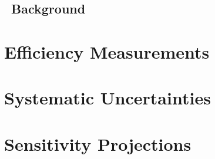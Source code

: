 \documentclass{cmspaper}
\begin{document}
\subsection{\dytt\ Background}
     \label{sec:bkg_dytt}
     

\section{Efficiency Measurements}

\section{Systematic Uncertainties}

\section{Sensitivity Projections}
  
\end{document}
